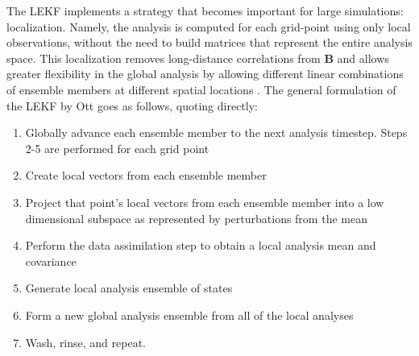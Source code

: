 The LEKF implements a strategy that becomes important for large simulations: localization.
Namely, the analysis is computed for each grid-point using only local observations, without the need to build matrices that represent the entire analysis space.
This localization removes long-distance correlations from $\mathbf{B}$ and allows greater flexibility in the global analysis by allowing different linear combinations of ensemble members at different spatial locations \cite{kalnay20074}.
The general formulation of the LEKF by Ott \cite{ott2004local} goes as follows, quoting directly:
\begin{enumerate}
\item Globally advance each ensemble member to the next analysis timestep. Steps 2-5 are performed for each grid point
\item Create local vectors from each ensemble member
\item Project that point's local vectors from each ensemble member into a low dimensional subspace as represented by perturbations from the mean
\item Perform the data assimilation step to obtain a local analysis mean and covariance
\item Generate local analysis ensemble of states
\item Form a new global analysis ensemble from all of the local analyses
\item Wash, rinse, and repeat.
\end{enumerate}

